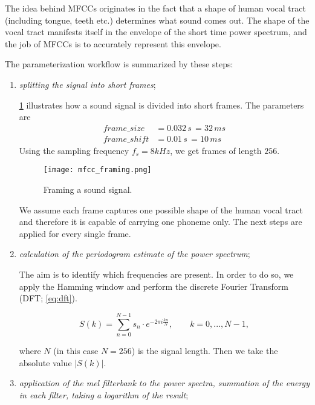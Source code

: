The idea behind MFCCs originates in the fact that a shape of human vocal tract (including tongue, teeth etc.) determines what sound comes out. The shape of the vocal tract manifests itself in the envelope of the short time power spectrum, and the job of MFCCs is to accurately represent this envelope.

The parameterization workflow is summarized by these steps:

\begin{enumerate}
\item \textit{splitting the signal into short frames};

\cref{fig:methods:mfcc_framing} illustrates how a sound signal is divided into short frames. The parameters are
\begin{align*}
frame\_size &= 0.032 \,s \,= 32 \,ms \\
frame\_shift &= 0.01 \,s \,= 10 \,ms
\end{align*}
Using the sampling frequency $ f_s = 8 kHz $, we get frames of length $ 256 $.

\begin{figure}[H]
\centering
\texttt{[image: mfcc\_framing.png]}
\caption{Framing a sound signal.}
\label{fig:methods:mfcc_framing}
\end{figure}

We assume each frame captures one possible shape of the human vocal tract and therefore it is capable of carrying one phoneme only. The next steps are applied for every single frame.

\item \textit{calculation of the periodogram estimate of the power spectrum}; 

The aim is to identify which frequencies are present. In order to do so, we apply the Hamming window and perform the discrete Fourier Transform (DFT; \cref{eq:dft}).

\begin{equation} \label{eq:dft}
S(k) = \displaystyle\sum_{n=0}^{N-1} s_n \cdot e^{-2 \pi i \frac{kn}{N}}, \qquad k = 0, ..., N-1, 
\end{equation}

where $ N $ (in this case $ N = 256 $) is the signal length. Then we take the absolute value $ |S(k)| $.

\item \textit{application of the mel filterbank to the power spectra, summation of the energy in each filter, taking a logarithm of the result};


\end{enumerate}
